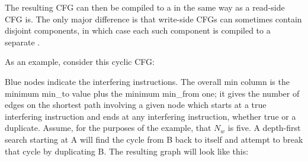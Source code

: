 The resulting CFG can then be compiled to a {\StateMachine} in the
same way as a read-side CFG is.  The only major difference is that
write-side CFGs can sometimes contain disjoint components, in which
case each such component is compiled to a separate {\StateMachine}.

As an example, consider this cyclic CFG:


Blue nodes indicate the interfering instructions.  The overall min
column is the minimum min\_to value plus the minimum min\_from one; it
gives the number of edges on the shortest path involving a given node
which starts at a true interfering instruction and ends at any
interfering instruction, whether true or a duplicate.  Assume, for the
purposes of the example, that $N_w$ is five.  A depth-first search
starting at A will find the cycle from B back to itself and attempt to
break that cycle by duplicating B.  The resulting graph will look like
this:

